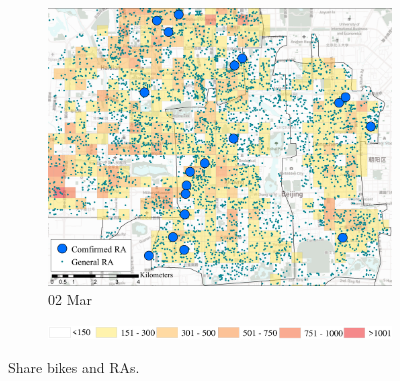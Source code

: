 \documentclass[preprints,ijgi,submit,moreauthors]{Definitions/mdpi}
\begin{document}
\begin{figure}[H]
\begin{subfigure}{.32\textwidth}
        \includegraphics[width=\textwidth]{Figures/Relation_with_POIs/POIsRAD2020_03_02.pdf}
        \caption{02 Mar}
    \end{subfigure}

    \vspace{6pt}
    \begin{subfigure}{.7\textwidth}
        \includegraphics[width=\textwidth]{Figures/AppendixLegend2.eps}
    \end{subfigure}
    \caption{Share bikes and RAs.}
    \label{fig:BSS_communities}
\end{figure}

\end{document}
